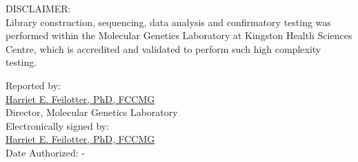 \documentclass[10pt]{article}
\begin{document}
DISCLAIMER: \\
Library construction, sequencing, data analysis and confirmatory testing was performed within the Molecular Genetics Laboratory at Kingston Health Sciences Centre, which is accredited and validated to perform such high complexity testing.

\hfill \parbox{12cm}{
Reported by:\\
\underline{Harriet E. Feilotter, PhD, FCCMG }\\
Director, Molecular Genetics Laboratory \\

\vspace{1em}
Electronically signed by: \\
\underline{Harriet E. Feilotter, PhD, FCCMG}\\
Date Authorized: -
}
\end{document}
